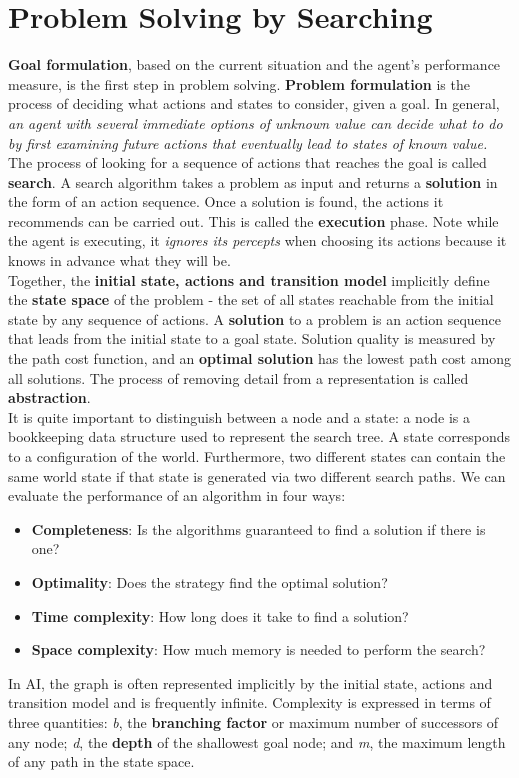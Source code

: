 \documentclass[twoside]{article}
\begin{document}
\section{Problem Solving by Searching}

\textbf{Goal formulation}, based on the current situation and the agent's
performance measure, is the first step in problem solving. \textbf{Problem 
formulation} is the process of deciding what actions and states to consider,
given a goal. In general, \emph{an agent with several immediate options of 
unknown value can decide what to do by first examining future actions that 
eventually lead to states of known value.} The process of looking for a 
sequence of actions that reaches the goal is called \textbf{search}. A search
algorithm takes a problem as input and returns a \textbf{solution} in the 
form of an action sequence. Once a solution is found, the actions it recommends
can be carried out. This is called the \textbf{execution} phase. Note while
the agent is executing, it \emph{ignores its percepts} when choosing its actions
because it knows in advance what they will be.\\

Together, the \textbf{initial state, actions and transition model} implicitly
define the \textbf{state space} of the problem - the set of all states
reachable from the initial state by any sequence of actions. A \textbf{solution}
to a problem is an action sequence that leads from the initial state to a goal
state. Solution quality is measured by the path cost function, and an \textbf{
optimal solution} has the lowest path cost among all solutions. The process 
of removing detail from a representation is called \textbf{abstraction}.\\

It is quite important to distinguish between a node and a state: a node is a 
bookkeeping data structure used to represent the search tree. A state 
corresponds to a configuration of the world. Furthermore, two different states
can contain the same world state if that state is generated via two different
search paths. We can evaluate the performance of an algorithm in four ways:
\begin{itemize}
    \item \textbf{Completeness}: Is the algorithms guaranteed to find a solution
    if there is one?
    \item \textbf{Optimality}: Does the strategy find the optimal solution?
    \item \textbf{Time complexity}: How long does it take to find a solution?
    \item \textbf{Space complexity}: How much memory is needed to perform the
    search?
\end{itemize}
In AI, the graph is often represented implicitly by the initial state, actions
and transition model and is frequently infinite. Complexity is expressed in
terms of three quantities: \emph{b}, the \textbf{branching factor} or maximum
number of successors of any node; \emph{d}, the \textbf{depth} of the shallowest
goal node; and \emph{m}, the maximum length of any path in the state space.
\end{document}
